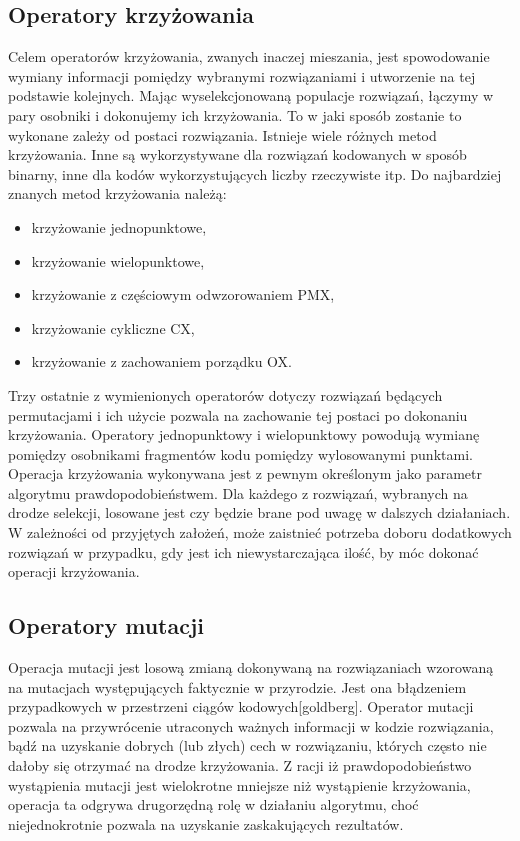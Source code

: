 \subsection{Operatory krzyżowania}
Celem operatorów krzyżowania, zwanych inaczej mieszania, jest spowodowanie wymiany informacji pomiędzy wybranymi rozwiązaniami i utworzenie na tej podstawie kolejnych. Mając wyselekcjonowaną populacje rozwiązań, łączymy w pary osobniki i dokonujemy ich krzyżowania. To w jaki sposób zostanie to wykonane zależy od postaci rozwiązania. Istnieje wiele różnych metod krzyżowania. Inne są wykorzystywane dla rozwiązań kodowanych w sposób binarny, inne dla kodów wykorzystujących liczby rzeczywiste itp. Do najbardziej znanych metod krzyżowania należą:
\begin{itemize}
\item krzyżowanie jednopunktowe,
\item krzyżowanie wielopunktowe,
\item krzyżowanie z częściowym odwzorowaniem PMX,
\item krzyżowanie cykliczne CX,
\item krzyżowanie z zachowaniem porządku OX.
\end{itemize}

Trzy ostatnie z wymienionych operatorów dotyczy rozwiązań będących permutacjami i ich użycie pozwala na zachowanie tej postaci po dokonaniu krzyżowania. Operatory jednopunktowy i wielopunktowy powodują wymianę pomiędzy osobnikami fragmentów kodu pomiędzy wylosowanymi punktami. Operacja krzyżowania wykonywana jest z pewnym określonym jako parametr algorytmu prawdopodobieństwem. Dla każdego z rozwiązań, wybranych na drodze selekcji, losowane jest czy będzie brane pod uwagę w dalszych działaniach. W zależności od przyjętych założeń, może zaistnieć potrzeba doboru dodatkowych rozwiązań w przypadku, gdy jest ich niewystarczająca ilość, by móc dokonać operacji krzyżowania.

\subsection{Operatory mutacji}
Operacja mutacji jest losową zmianą dokonywaną na rozwiązaniach wzorowaną na mutacjach występujących faktycznie w przyrodzie. Jest ona błądzeniem przypadkowych w przestrzeni ciągów kodowych[goldberg]. Operator mutacji pozwala na przywrócenie utraconych ważnych informacji w kodzie rozwiązania, bądź na uzyskanie dobrych (lub złych) cech w rozwiązaniu, których często nie dałoby się otrzymać na drodze krzyżowania. Z racji iż prawdopodobieństwo wystąpienia mutacji jest wielokrotne mniejsze niż wystąpienie krzyżowania, operacja ta odgrywa drugorzędną rolę w działaniu algorytmu, choć niejednokrotnie pozwala na uzyskanie zaskakujących rezultatów.

